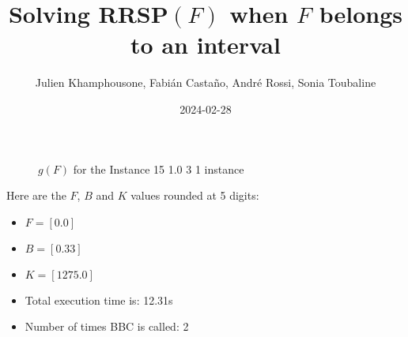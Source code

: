 \documentclass{article}
\begin{document}
     \title{Solving RRSP$(F)$ when $F$ belongs to an interval}
     \author{Julien Khamphousone, Fabi\'an Casta\~no, Andr\'e Rossi, Sonia Toubaline}
     \date{2024-02-28}
     \maketitle
     \def\F{{0.0,0.0}}
\def\gF{{12.75,1275.0}}
\begin{figure}[ht!]
    \begin{center}
    \end{center}
    \vspace*{-2eM}
    \caption{$g(F)$ for the Instance 15 1.0 3 1 instance}\label{fig:1}
    \end{figure}
    Here are the $F$, $B$ and $K$ values rounded at 5 digits:

\begin{itemize}
	\item  $F = [0.0]$
 \item $B = [0.33]$
 \item  $K = [1275.0]$\item Total execution time is: 12.31s\item Number of times BBC is called: 2\end{itemize}
\end{document}
